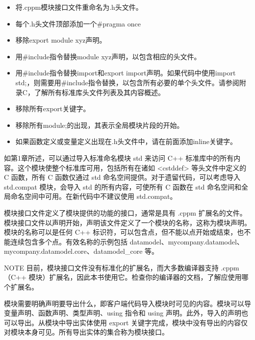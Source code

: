 \begin{itemize}
\item
将.cppm模块接口文件重命名为.h头文件。

\item
每个.h头文件顶部添加一个\#pragma once

\item
移除export module xyz声明。

\item
用\#include指令替换module xyz声明，以包含相应的头文件。

\item
用\#include指令替换import和export import声明。如果代码中使用import std;，则需要用\#include指令替换，以包含所有必要的单个头文件。请参阅附录C，了解所有标准库头文件列表及其内容概述。

\item
移除所有export关键字。

\item
移除所有module;的出现，其表示全局模块片段的开始。

\item
如果函数定义或变量定义出现在.h头文件中，请在前面添加inline关键字。
\end{itemize}



如第1章所述，可以通过导入标准命名模块 std 来访问 C++ 标准库中的所有内容。这个模块使整个标准库可用，包括所有在诸如 <cstddef> 等头文件中定义的 C 函数，所有 C 函数仅通过 std 命名空间提供。对于遗留代码，可以考虑导入 std.compat 模块，会导入 std 的所有内容，可使所有 C 函数在 std 命名空间和全局命名空间中可用。在新代码中不建议使用 std.compat。


模块接口文件定义了模块提供的功能的接口，通常是具有 .cppm 扩展名的文件。模块接口文件以声明开始，声明该文件定义了一个模块的名称，这称为模块声明。模块的名称可以是任何 C++ 标识符，可以包含点，但不能以点开始或结束，也不能连续包含多个点。有效名称的示例包括 datamodel、mycompany.datamodel、mycompany.datamodel.core、datamodel\_core 等。

\begin{myNotic}{NOTE}
目前，模块接口文件没有标准化的扩展名，而大多数编译器支持 .cppm（C++ 模块）扩展名，因此本书使用它。检查你的编译器的文档，了解应使用哪个扩展名。
\end{myNotic}

模块需要明确声明要导出什么，即客户端代码导入模块时可见的内容。模块可以导变量声明、函数声明、类型声明、using 指令和 using 声明。此外，导入的声明也可以导出。从模块中导出实体使用 export 关键字完成，模块中没有导出的内容仅对模块本身可见。所有导出实体的集合称为模块接口。

